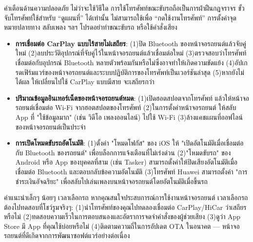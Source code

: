 \begin{tcbwarn}{คำเตือนด้านความปลอดภัย}
ไม่ว่าจะใช้วิธีใด การใช้โทรศัพท์ขณะขับรถถือเป็นการฝ่าฝืนกฎจราจร ขั้วจับโทรศัพท์ใช้สำหรับ “ดูแผนที่” ได้เท่านั้น ไม่สามารถใช้เพื่อ “กดใช้งานโทรศัพท์” การตั้งค่าจุดหมายปลายทาง สลับเพลง ฯลฯ โปรดอย่าทำขณะขับรถ หรือใช้คำสั่งเสียง

\end{tcbwarn}


\begin{itemize}
  \item \textbf{การเชื่อมต่อ CarPlay แบบไร้สายไม่เสถียร}: (1)ปิด Bluetooth ของหน้าจอรถยนต์แล้วจับคู่ใหม่ (2)ลบประวัติอุปกรณ์ที่จับคู่ไว้ในหน้าจอรถยนต์แล้วเชื่อมต่อใหม่ (3)ตรวจสอบว่าโทรศัพท์เชื่อมต่อกับอุปกรณ์ Bluetooth หลายตัวพร้อมกันหรือไม่ซึ่งอาจทำให้เกิดความขัดแย้ง (4)อัปเกรดเฟิร์มแวร์ของหน้าจอรถยนต์และระบบปฏิบัติการของโทรศัพท์เป็นเวอร์ชันล่าสุด (5)หากยังไม่ได้ผล ให้เปลี่ยนไปใช้ CarPlay แบบมีสาย จะเสถียรกว่า
  \item \textbf{ปริมาณข้อมูลอินเทอร์เน็ตของหน้าจอรถยนต์หมด}: (1)เปิดฮอตสปอตจากโทรศัพท์ แล้วให้หน้าจอรถยนต์เชื่อมต่อ Wi-Fi จากฮอตสปอตของโทรศัพท์ (2)ในการตั้งค่าหน้าจอรถยนต์ ให้สลับ App ที่ "ใช้ข้อมูลมาก" (เช่น วิดีโอ เพลงออนไลน์) ไปใช้ Wi-Fi (3)ล้างแคชแผนที่ออฟไลน์ของหน้าจอรถยนต์เป็นประจำ
  \item \textbf{การเปิดโหมดขับรถอัตโนมัติ}: (1)ตั้งค่า "โหมดโฟกัส" ของ iOS ให้ "เปิดอัตโนมัติเมื่อเชื่อมต่อกับ Bluetooth ของรถยนต์" เพื่อบล็อกการแจ้งเตือนที่ไม่เร่งด่วน (2)"โหมดขับรถ" ของ Android หรือ App ของบุคคลที่สาม (เช่น Tasker) สามารถตั้งค่าให้ปิดเสียงอัตโนมัติเมื่อเชื่อมต่อ Bluetooth และตอบกลับข้อความอัตโนมัติ (3)โทรศัพท์ Huawei สามารถตั้งค่า "การชำระเงินอัจฉริยะ" เพื่อสลับไปเล่นเพลงบนหน้าจอรถยนต์โดยอัตโนมัติเมื่อขึ้นรถ
\end{itemize}

\begin{tcbinfo}{คำแนะนำเล็กๆ น้อยๆ เวลาเลือกรถ}
หากคุณสนใจประสบการณ์การใช้งานหน้าจอรถยนต์ เวลาเลือกรถต้องไปทดสอบที่โชว์รูมจริงๆ: (1)นำโทรศัพท์ของคุณไปทดลองเชื่อมต่อ CarPlay/HiCar ว่าเสถียรหรือไม่ (2)ทดสอบความเร็วในการตอบสนองและอัตราการจดจำคำสั่งของผู้ช่วยเสียง (3)ดูว่า App Store มี App ที่คุณใช้บ่อยหรือไม่ (4)ติดตามความถี่ในการอัปเดต OTA ในอนาคต — หน้าจอรถยนต์ที่ดีเกิดจากการพัฒนาซอฟต์แวร์อย่างต่อเนื่อง

\end{tcbinfo}

